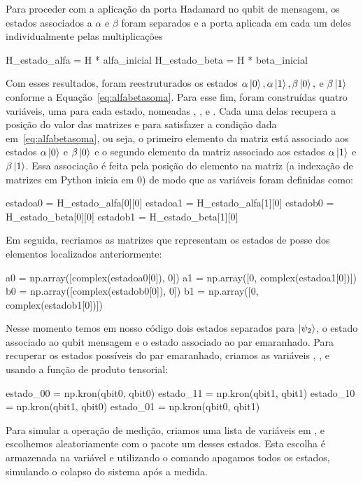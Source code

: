 Para proceder com a aplicação da porta Hadamard no qubit de mensagem, os estados associados a $\alpha$ e $\beta$ foram separados e a porta aplicada em cada um deles individualmente pelas multiplicações
\begin{pycode}
  H_estado_alfa = H * alfa_inicial
  H_estado_beta = H * beta_inicial
\end{pycode}
Com esses resultados, foram reestruturados os estados $\alpha\ket{0}, \alpha\ket{1}, \beta\ket{0},$ e $\beta\ket{1}$ conforme a Equação~\eqref{eq:alfabetasoma}. Para esse fim, foram construídas quatro variáveis, uma para cada estado, nomeadas , ,  e . Cada uma delas recupera a posição do valor das matrizes  e  para satisfazer a condição dada em~\eqref{eq:alfabetasoma}, ou seja, o primeiro elemento da matriz está associado aos estados $\alpha\ket{0}$ e $\beta\ket{0}$ e o segundo elemento da matriz associado aos estados $\alpha\ket{1}$ e $\beta\ket{1}$. Essa associação é feita pela posição do elemento na matriz (a indexação de matrizes em Python inicia em 0) de modo que as variáveis foram definidas como:
\begin{pycode}
  estadoa0 = H_estado_alfa[0][0]
  estadoa1 = H_estado_alfa[1][0]
  estadob0 = H_estado_beta[0][0]
  estadob1 = H_estado_beta[1][0]
\end{pycode}
Em seguida, recriamos as matrizes que representam os estados de posse dos elementos localizados anteriormente:
\begin{pycode}
  a0 = np.array([complex(estadoa0[0]), 0])
  a1 = np.array([0, complex(estadoa1[0])])
  b0 = np.array([complex(estadob0[0]), 0])
  b1 = np.array([0, complex(estadob1[0])])
\end{pycode}
Nesse momento temos em nosso código dois estados separados para $\ket{\psi_2}$, o estado associado ao qubit mensagem e o estado associado ao par emaranhado. Para recuperar os estados possíveis do par emaranhado, criamos as variáveis , ,  e  usando a função de produto tensorial:
\begin{pycode}
  estado_00 = np.kron(qbit0, qbit0)
  estado_11 = np.kron(qbit1, qbit1)
  estado_10 = np.kron(qbit1, qbit0)
  estado_01 = np.kron(qbit0, qbit1)
\end{pycode}
Para simular a operação de medição, criamos uma lista de variáveis em , e escolhemos aleatoriamente com o pacote  um desses estados. Esta escolha é armazenada na variável  e utilizando o comando  apagamos todos os estados, simulando o colapso do sistema após a medida.

